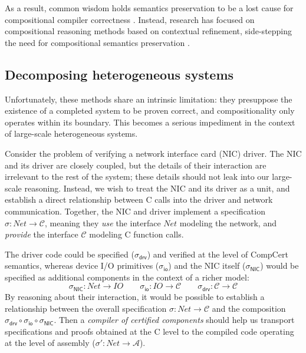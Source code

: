 \documentclass[sigplan,screen]{acmart}
\newcommand{\kw}[1]{\ensuremath{ \mathsf{#1} }}
\newcommand{\li}[1]{\mathit{#1}}
\begin{document}
As a result,
common wisdom holds semantics preservation
to be a lost cause
for compositional compiler correctness \cite{next700}.
Instead,
research has focused on
compositional reasoning methods
based on contextual refinement,
side-stepping the need for compositional semantics preservation
\cite{sepcompcert,compcertm}.


\subsection{Decomposing heterogeneous systems} %

Unfortunately,
these methods share an intrinsic limitation:
they presuppose the existence of a completed system
to be proven correct,
and compositionality only operates within its boundary.
This becomes a serious impediment
in the context of large-scale heterogeneous systems.

\begin{example} \label{ex:nicdriver} %
Consider the problem of verifying
a network interface card (NIC) driver.
The NIC and its driver are closely coupled,
but the details of their interaction
are irrelevant to the rest of the system;
these details should not leak into our large-scale reasoning.
Instead,
we wish to treat the NIC and its driver as a unit,
and establish a direct relationship between C calls into
the driver and network communication.
Together, the NIC and driver implement
a specification $\sigma :
\li{Net} \rightarrow \mathcal{C}$,
meaning they \emph{use} the interface $\li{Net}$
modeling the network,
and \emph{provide} the interface $\mathcal{C}$
modeling C function calls.

The driver code could be specified
($\sigma_\kw{drv}$)
and verified
at the level of CompCert semantics,
whereas device I/O primitives
($\sigma_\kw{io}$)
and the NIC itself
($\sigma_\kw{NIC}$)
would be specified as additional components
in the context of a richer model:
\[
  \sigma_\kw{NIC} : \li{Net} \rightarrow \li{IO}
  \qquad
  \sigma_\kw{io} : \li{IO} \rightarrow \mathcal{C}
  \qquad
  \sigma_\kw{drv} : \mathcal{C} \rightarrow \mathcal{C}
\]
By reasoning about their interaction,
it would be possible to establish a relationship between
the overall specification $\sigma : \li{Net} \rightarrow \mathcal{C}$ and
the composition
$\sigma_\kw{drv} \circ \sigma_\kw{io} \circ \sigma_\kw{NIC}$.
Then a \emph{compiler of certified components}
should help us transport specifications and proofs
obtained at the C level %
to the compiled code operating at the level of assembly
($\sigma' : \li{Net} \rightarrow \mathcal{A}$).
\end{example}
\end{document}
